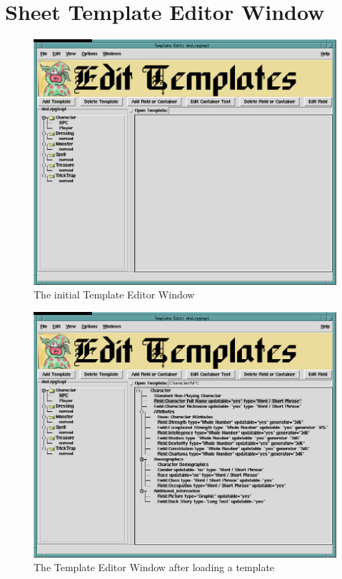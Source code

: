 \section{Sheet Template Editor Window}
\label{Template}

\begin{figure}[hbpt]
\begin{centering}
\includegraphics[width=5in]{TemplateEditor1.png}
\caption{The initial Template Editor Window}
\label{fig:tmped1}
\end{centering}
\end{figure}
\begin{figure}[hbpt]
\begin{centering}
\includegraphics[width=5in]{TemplateEditor2.png}
\caption{The Template Editor Window after loading a template}
\label{fig:tmped2}
\end{centering}
\end{figure}
